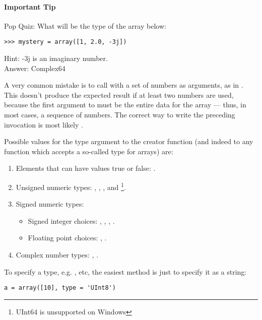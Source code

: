 \paragraph*{Important Tip} \label{sec:important-tips} 
Pop Quiz: What will be the type of the array below:
\begin{verbatim}
>>> mystery = array([1, 2.0, -3j])
\end{verbatim}
Hint: -3j is an imaginary number. \\
Answer: Complex64
         
A very common mistake is to call  with a set of numbers as
arguments, as in . This doesn't produce the expected
result if at least two numbers are used, because the first argument to
 must be the entire data for the array --- thus, in most cases,
a sequence of numbers. The correct way to write the preceding invocation is
most likely .

Possible values for the type argument to the
 creator function (and indeed to any function which accepts a
so-called type for arrays) are:
\begin{enumerate}
\item Elements that can have values true or false: .
\item Unsigned numeric types: ,
  , , and
  \footnote[1]{UInt64 is unsupported on Windows}.
\item Signed numeric types: 
   \begin{itemize}
   \item Signed integer choices: ,
      , , .
   \item Floating point choices: ,
      .
   \end{itemize}
\item Complex number types: ,
   .
\end{enumerate}

To specify a type, e.g. , etc, the easiest method is just to
specify it as a string:
\begin{verbatim}
a = array([10], type = 'UInt8')
\end{verbatim}

